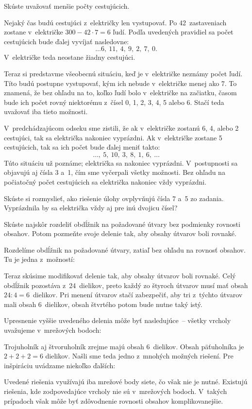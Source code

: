 {%
\napad
Skúste uvažovať menšie počty cestujúcich.

\riesenie
Nejaký čas budú cestujúci z~električky len vystupovať.
Po 42~zastaveniach zostane v~električke $300-42\cdot7=6$ ľudí.
Podľa uvedených pravidiel sa počet cestujúcich bude ďalej vyvíjať nasledovne:
$$
\dots 6,\ 11,\ 4,\ 9,\ 2,\ 7,\ 0.
$$
V~električke teda neostane žiadny cestujúci.

Teraz si predstavme všeobecnú situáciu, keď je v~električke neznámy počet ľudí.
Títo budú postupne vystupovať, kým ich nebude v~električke menej ako 7.
To znamená, že bez ohľadu na to, koľko ľudí bolo v~električke na začiatku,
časom bude ich počet rovný niektorému z~čísel 0, 1, 2, 3, 4, 5 alebo 6.
Stačí teda uvažovať iba tieto možnosti.

V~predchádzajúcom odseku sme zistili, že ak v~električke zostanú 6, 4,
alebo 2 cestujúci, tak sa električka nakoniec vyprázdni.
Ak v~električke zostane 5 cestujúcich, tak sa ich počet bude ďalej meniť
takto:
$$
\dots,\ 5,\ 10,\ 3,\ 8,\ 1,\ 6,\ \dots
$$
Túto situáciu už poznáme; električka sa nakoniec vyprázdni.
V~postupnosti sa objavujú aj čísla 3 a~1, čím sme vyčerpali všetky
možnosti.
Bez ohľadu na počiatočný počet cestujúcich sa električka nakoniec vždy
vyprázdni.

\poznamka
Skúste si rozmyslieť, ako riešenie úlohy ovplyvňujú čísla 7 a~5 zo zadania.
Vyprázdnila by sa električka vždy
aj pre inú dvojicu čísel?
}

{%
\napad
Skúste najskôr rozdeliť obdĺžnik na požadované útvary bez podmienky
rovnosti obsahov. Potom pozmeňte svoje delenie tak, aby obsahy útvarov
boli rovnaké.

\riesenie
Rozdelíme obdĺžnik na požadované útvary, zatiaľ bez ohľadu na rovnosť
obsahov. Tu je jedna z~možností:
%

Teraz skúsime modifikovať delenie tak, aby obsahy útvarov boli rovnaké.
Celý obdĺžnik pozostáva z~24~dielikov, preto každý zo štyroch útvarov musí mať
obsah $24:4=6$~dielikov. Pri menení útvarov stačí zabezpečiť, aby tri
z~týchto útvarov mali obsah 6~dielikov, obsah štvrtého potom bude nutne
taký istý.

Upresnenie vyššie uvedeného delenia môže byť nasledujúce~-- všetky
vrcholy uvažujeme v~mrežových bodoch:
%

Trojuholník aj štvoruholník zrejme majú obsah 6~dielikov.
Obsah päťuholníka je $2+2+2=6$ dielikov.
Našli sme teda jedno z~mnohých možných riešení.
Pre inšpiráciu uvádzame niekoľko ďalších:
%

\poznamka
Uvedené riešenia využívajú iba mrežové body siete, čo však nie je nutné.
Existujú riešenia, kde zodpovedajúce vrcholy nie sú v~mrežových
bodoch.
V~takých prípadoch však môže byť zdôvodnenie rovnosti obsahov
komplikovanejšie.
}

